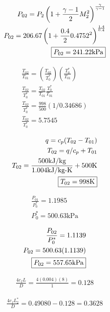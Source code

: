 \begin{align*}
    P_{02}=P_2\left(1+\frac{\gamma-1}{2}M_2^2\right)^\frac{\gamma}{\gamma-1} \\
    P_{02}=206.67\left(1+\frac{0.4}{2}0.4752^2\right)^\frac{1.4}{0.4} \\
    \fbox{$P_{02}=241.22$kPa}
\end{align*}


\begin{align*}
    \frac{T_{02}}{T_{01}}=\left(\frac{T_{02}}{T_{0}^*}\right)
    \left(\frac{T_{0}^*}{T_{01}}\right) \\
    \frac{T_{02}}{T_0^*}=\frac{T_{02}}{T_{01}}\frac{T_{0}^*}{T_{01}} \\
    \frac{T_{02}}{T_0^*}=\frac{998}{500}(1/0.34686) \\
    \frac{T_{02}}{T_0^*}=5.7545
\end{align*}

\begin{align*}
    q=c_p(T_{02}-T_{01}) \\
    T_{02}=q/c_p+T_{01} \\
    T_{02}=\frac{500\text{kJ/kg}}{1.004\text{kJ/kg-K}}+500\text{K} \\
    \fbox{$T_{02}=998$K}
\end{align*}

\begin{align*}
    \frac{P_{01}}{P_0^*}=1.1985 \\
    P_0^*=500.63\text{kPa}
\end{align*}

\begin{align*}
    \frac{P_{02}}{P_0^*}=1.1139 \\
    P_{02}=500.63(1.1139) \\
    \fbox{$P_{02}=557.65$kPa}
\end{align*}

\begin{align*}
    \frac{4c_fL}{D}=\frac{4(0.004)(8)}{1}=0.128
\end{align*}

\begin{align*}
    \frac{4c_fL_2^*}{D}=0.49080-0.128=0.3628
\end{align*}